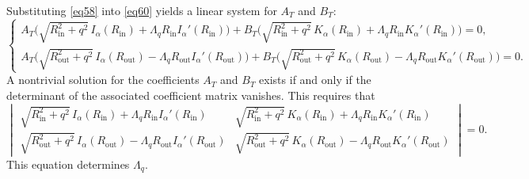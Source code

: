 \documentclass[12pt,reqno]{amsart}
\numberwithin{equation}{section}
\begin{document}
Substituting \eqref{eq58} into \eqref{eq60} yields a linear system for  $A_T$ and $B_T$:
\begin{equation*}
\begin{cases}
    A_T \bigl( \sqrt{R_{\mathrm{in}}^2 + q^2} \, I_{\alpha}(R_{\mathrm{in}}) + \Lambda_q R_{\mathrm{in}} I_{\alpha}'(R_{\mathrm{in}}) \bigr)
    + B_T \bigl( \sqrt{R_{\mathrm{in}}^2 + q^2} \, K_{\alpha}(R_{\mathrm{in}}) + \Lambda_q R_{\mathrm{in}} K_{\alpha}'(R_{\mathrm{in}}) \bigr) = 0, \\[6pt]
    A_T \bigl( \sqrt{R_{\mathrm{out}}^2 + q^2} \, I_{\alpha}(R_{\mathrm{out}}) - \Lambda_q R_{\mathrm{out}} I_{\alpha}'(R_{\mathrm{out}}) \bigr)
    + B_T \bigl( \sqrt{R_{\mathrm{out}}^2 + q^2} \, K_{\alpha}(R_{\mathrm{out}}) - \Lambda_q R_{\mathrm{out}} K_{\alpha}'(R_{\mathrm{out}}) \bigr) = 0.
\end{cases}
\end{equation*}
A nontrivial solution for the coefficients $A_T$ and $B_T$ exists if and only if the determinant of the associated coefficient matrix vanishes. This requires that
\begin{equation}\label{eq62}
\begin{vmatrix}
    \sqrt{R_{\mathrm{in}}^2 + q^2} \, I_{\alpha}(R_{\mathrm{in}}) + \Lambda_q R_{\mathrm{in}} I_{\alpha}'(R_{\mathrm{in}}) &
    \sqrt{R_{\mathrm{in}}^2 + q^2} \, K_{\alpha}(R_{\mathrm{in}}) + \Lambda_q R_{\mathrm{in}} K_{\alpha}'(R_{\mathrm{in}}) \\[8pt]
    \sqrt{R_{\mathrm{out}}^2 + q^2} \, I_{\alpha}(R_{\mathrm{out}}) - \Lambda_q R_{\mathrm{out}} I_{\alpha}'(R_{\mathrm{out}}) &
    \sqrt{R_{\mathrm{out}}^2 + q^2} \, K_{\alpha}(R_{\mathrm{out}}) - \Lambda_q R_{\mathrm{out}} K_{\alpha}'(R_{\mathrm{out}})
\end{vmatrix} = 0.
\end{equation}
This equation determines $\Lambda_q$.
\end{document}
